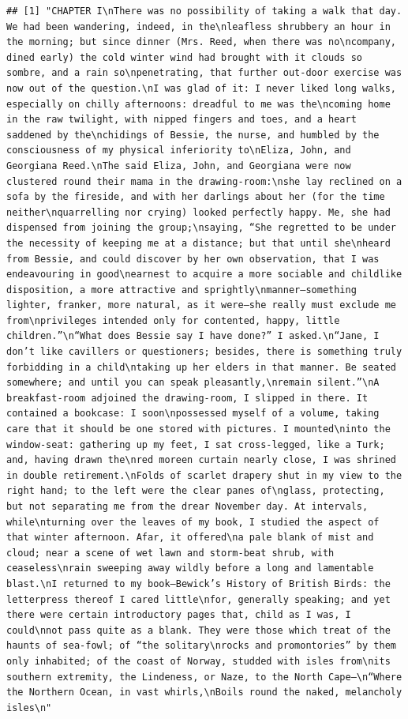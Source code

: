 \documentclass[
]{book}
\begin{document}
\begin{verbatim}
## [1] "CHAPTER I\nThere was no possibility of taking a walk that day. We had been wandering, indeed, in the\nleafless shrubbery an hour in the morning; but since dinner (Mrs. Reed, when there was no\ncompany, dined early) the cold winter wind had brought with it clouds so sombre, and a rain so\npenetrating, that further out-door exercise was now out of the question.\nI was glad of it: I never liked long walks, especially on chilly afternoons: dreadful to me was the\ncoming home in the raw twilight, with nipped fingers and toes, and a heart saddened by the\nchidings of Bessie, the nurse, and humbled by the consciousness of my physical inferiority to\nEliza, John, and Georgiana Reed.\nThe said Eliza, John, and Georgiana were now clustered round their mama in the drawing-room:\nshe lay reclined on a sofa by the fireside, and with her darlings about her (for the time neither\nquarrelling nor crying) looked perfectly happy. Me, she had dispensed from joining the group;\nsaying, “She regretted to be under the necessity of keeping me at a distance; but that until she\nheard from Bessie, and could discover by her own observation, that I was endeavouring in good\nearnest to acquire a more sociable and childlike disposition, a more attractive and sprightly\nmanner—something lighter, franker, more natural, as it were—she really must exclude me from\nprivileges intended only for contented, happy, little children.”\n“What does Bessie say I have done?” I asked.\n“Jane, I don’t like cavillers or questioners; besides, there is something truly forbidding in a child\ntaking up her elders in that manner. Be seated somewhere; and until you can speak pleasantly,\nremain silent.”\nA breakfast-room adjoined the drawing-room, I slipped in there. It contained a bookcase: I soon\npossessed myself of a volume, taking care that it should be one stored with pictures. I mounted\ninto the window-seat: gathering up my feet, I sat cross-legged, like a Turk; and, having drawn the\nred moreen curtain nearly close, I was shrined in double retirement.\nFolds of scarlet drapery shut in my view to the right hand; to the left were the clear panes of\nglass, protecting, but not separating me from the drear November day. At intervals, while\nturning over the leaves of my book, I studied the aspect of that winter afternoon. Afar, it offered\na pale blank of mist and cloud; near a scene of wet lawn and storm-beat shrub, with ceaseless\nrain sweeping away wildly before a long and lamentable blast.\nI returned to my book—Bewick’s History of British Birds: the letterpress thereof I cared little\nfor, generally speaking; and yet there were certain introductory pages that, child as I was, I could\nnot pass quite as a blank. They were those which treat of the haunts of sea-fowl; of “the solitary\nrocks and promontories” by them only inhabited; of the coast of Norway, studded with isles from\nits southern extremity, the Lindeness, or Naze, to the North Cape—\n“Where the Northern Ocean, in vast whirls,\nBoils round the naked, melancholy isles\n"

\end{verbatim}
\end{document}
